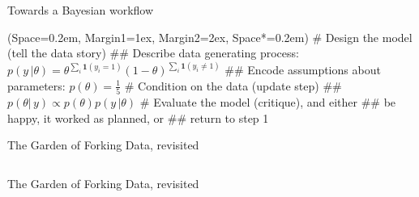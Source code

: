 \documentclass[12pt, aspectratio=149]{beamer}
\newcommand{\listSpace}{0.2em}
\theoremstyle{plain}
\begin{document}
\begin{frame}[fragile]{Towards a Bayesian workflow}
	\begin{easylist}[enumerate]
		\ListProperties(Space=\listSpace, Margin1=1ex, Margin2=2ex, Space*=\listSpace)
		# Design the model (tell the data story)
		## Describe data generating process: $p(y \, \vert \theta) = \theta^{\sum_i{\mathbf{1}(y_i = 1)}} (1 - \theta)^{\sum_i{\mathbf{1}(y_i \neq 1)}}$
		## Encode assumptions about parameters: $p(\theta) = \frac{1}{5}$
		# Condition on the data (update step)
		## $p(\theta \vert \, y) \propto p(\theta) p(y \, \vert \theta)$
		# Evaluate the model (critique), and either
		## be happy, it worked as planned, or
		## return to step 1
	\end{easylist}
\end{frame}

\begin{frame}[fragile]{The Garden of Forking Data, revisited}
	\inputminted[fontsize=\tiny]{python}{../code/marbles.py}
\end{frame}

\begin{frame}[fragile]{The Garden of Forking Data, revisited}
	\inputminted[fontsize=\tiny]{python}{../code/forking_data.py}
\end{frame}
\end{document}
